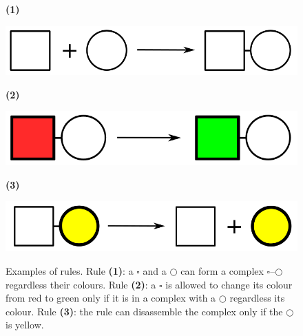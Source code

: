 \documentclass[12pt, twoside]{fithesis2} %
\begin{document}
\begin{figure}[!h]
\begin{center}
\begin{minipage}[l]{0.1\textwidth}
    \textbf{(1)}
  \end{minipage}
  \begin{minipage}[r]{0.6\textwidth}
    {\hspace*{0.8cm}\includegraphics[scale=0.2]{pics/rule_complex}}
\end{minipage}

\begin{minipage}[l]{0.1\textwidth}
    \textbf{(2)}
  \end{minipage}
  \begin{minipage}[r]{0.6\textwidth}
    {\hspace*{1.35cm}\includegraphics[scale=0.2]{pics/rule_change}}
\end{minipage}

\begin{minipage}[l]{0.1\textwidth}
    \textbf{(3)}
  \end{minipage}
  \begin{minipage}[r]{0.6\textwidth}
    {\hspace*{1.3cm}\includegraphics[scale=0.2]{pics/rule_diss}}
\end{minipage}
\end{center}
\caption{Examples of rules. Rule \textbf{(1)}: a {\large $\square$} and a $\bigcirc$ can form a complex {\large $\square$}--$\bigcirc$ regardless their colours. Rule \textbf{(2)}: a {\large $\square$} is allowed to change its colour from red to green only if it is in a complex with a $\bigcirc$ regardless its colour. Rule \textbf{(3)}: the rule can disassemble the complex only if the $\bigcirc$ is yellow.}\label{rules:fig}
\end{figure}
\end{document}
